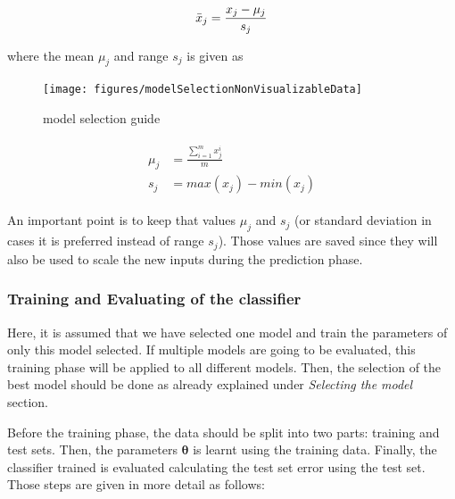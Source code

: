 \begin{equation}{\label{eqn:scalingFeatures}}
\bar{x}_j = \frac{x_j - \mu_j}{s_j} 
\end{equation} 

where the mean $\mu_j$ and range $s_j$ is given as

\begin{landscape}
\begin{figure}
\begin{center}
\texttt{[image: figures/modelSelectionNonVisualizableData]}    %
\caption{model selection guide} 
\label{fig:modelSelection}
\end{center}
\end{figure}
\end{landscape}



\begin{align}
\label{eqn:meandAndRange}
\begin{split}
\mu_j & = \frac{\sum\limits_{i=1}^m {x_j^i} }{m}
\\
s_j & = max(x_j) - min(x_j)
\end{split}
\end{align}

An important point is to keep that values $\mu_j$ and $s_j$ (or standard deviation in cases it is preferred instead of range $s_j$). 
Those values are saved since they will also be used to scale the new inputs during the prediction phase.


\subsubsection{Training and Evaluating of the classifier}

Here, it is assumed that we have selected one model and train the parameters of only this model selected. 
If multiple models are going to be evaluated, this training phase will be applied to all different models. 
Then, the selection of the best model should be done as already explained under \emph{Selecting the model} section.  

Before the training phase, the data should be split into two parts: training and test sets.
Then, the parameters $\bm{\theta}$ is learnt using the training data. 
Finally, the classifier trained is evaluated calculating the test set error using the test set.
Those steps are given in more detail as follows:
 
